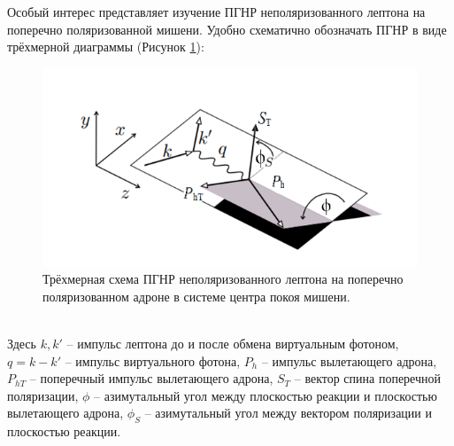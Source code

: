 \documentclass{extarticle}
\begin{document}
Особый интерес представляет изучение ПГНР неполяризованного лептона на поперечно поляризованной мишени. Удобно схематично обозначать ПГНР в виде трёхмерной диаграммы (Рисунок \ref{fig:sidis}):
\begin{figure}[h]
	\centering
	\includegraphics{sidis.png}
	\caption{Трёхмерная схема ПГНР неполяризованного лептона на поперечно поляризованном адроне в системе центра покоя мишени.}
	\label{fig:sidis}
\end{figure} \\
Здесь $k, k'$ -- импульс лептона до и после обмена виртуальным фотоном, $q = k-k'$ -- импульс виртуального фотона, $P_h$ -- импульс вылетающего адрона, $P_{hT}$ -- поперечный импульс вылетающего адрона, $S_T$ -- вектор спина поперечной поляризации, $\phi$ -- азимутальный угол между плоскостью реакции и плоскостью вылетающего адрона, $\phi_S$ -- азимутальный угол между вектором поляризации и плоскостью реакции. 
\end{document}
